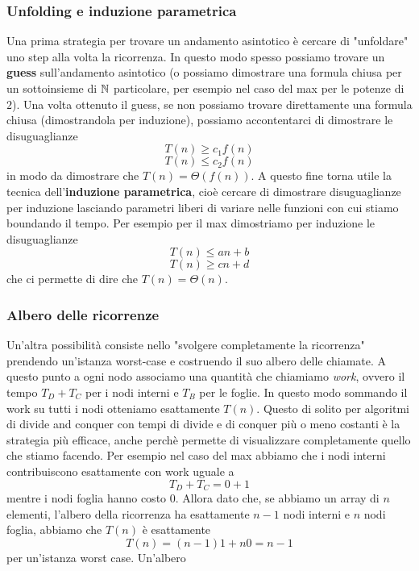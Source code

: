 \documentclass[11pt]{scrartcl}
\newcommand{\bigtheta}[1]{\Theta\!\left(#1\right)}
\begin{document}
	\subsubsection{Unfolding e induzione parametrica}
	Una prima strategia per trovare un andamento asintotico è cercare di "unfoldare" uno step alla volta la ricorrenza. In questo modo spesso possiamo trovare un \textbf{guess} sull'andamento asintotico (o possiamo dimostrare una formula chiusa per un sottoinsieme di $\mathbb N$ particolare, per esempio nel caso del max per le potenze di $2$). Una volta ottenuto il guess, se non possiamo trovare direttamente una formula chiusa (dimostrandola per induzione), possiamo accontentarci di dimostrare le disuguaglianze
	$$T(n)\ge c_1f(n)$$
	$$T(n)\le c_2f(n)$$
	in modo da dimostrare che $T(n)=\bigtheta{f(n)}$. A questo fine torna utile la tecnica dell'\textbf{induzione parametrica}, cioè cercare di dimostrare disuguaglianze per induzione lasciando parametri liberi di variare nelle funzioni con cui stiamo boundando il tempo. Per esempio per il max dimostriamo per induzione le disuguaglianze
	$$T(n)\le an+b$$
	$$T(n)\ge cn+d$$
	che ci permette di dire che $T(n)=\bigtheta{n}$.
	
	\subsubsection{Albero delle ricorrenze}
	
	Un'altra possibilità consiste nello "svolgere completamente la ricorrenza" prendendo un'istanza worst-case e costruendo il suo albero delle chiamate. A questo punto a ogni nodo associamo una quantità che chiamiamo \textit{work}, ovvero il tempo $T_D+T_C$ per i nodi interni e $T_B$ per le foglie. In questo modo sommando il work su tutti i nodi otteniamo esattamente $T(n)$. Questo di solito per algoritmi di divide and conquer con tempi di divide e di conquer più o meno costanti è la strategia più efficace, anche perchè permette di visualizzare completamente quello che stiamo facendo. Per esempio nel caso del max abbiamo che i nodi interni contribuiscono esattamente con work uguale a
	$$T_D+T_C=0+1$$
	mentre i nodi foglia hanno costo $0$. Allora dato che, se abbiamo un array di $n$ elementi, l'albero della ricorrenza ha esattamente $n-1$ nodi interni e $n$ nodi foglia, abbiamo che $T(n)$ è esattamente
	$$T(n)=(n-1)1+n0=n-1$$
	per un'istanza worst case. Un'albero 
	
\end{document}
